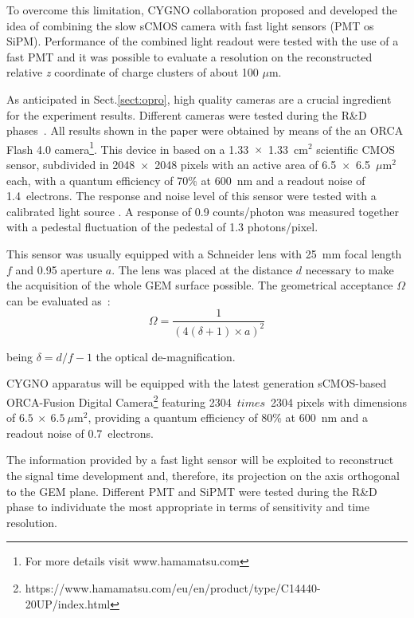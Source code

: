 \documentclass[physics,article,submit,moreauthors,pdftex]{Definitions/mdpi}
\begin{document}
To overcome this limitation, CYGNO collaboration proposed and developed the idea of combining the slow sCMOS camera with fast light sensors (PMT os SiPM).
Performance of the combined light readout were tested with the use of a fast PMT \cite{bib:combined} and it was possible to evaluate a resolution on the reconstructed relative {\it z} coordinate of charge clusters of about 100 $\mu$m.


As anticipated in Sect.\ref{sect:opro}, high quality cameras are a crucial ingredient for the experiment results. Different cameras were tested during the R\&D phases~\cite{bib:cameras}. All results shown in the paper were obtained by means of the 
 an ORCA Flash 4.0 camera\footnote{For more details visit www.hamamatsu.com}. This device in based on a 1.33~$\times$~1.33~cm$^2$ scientific CMOS sensor, subdivided in 2048~$\times$~2048 pixels with an active area of 6.5~$\times$~6.5~$\mu$m$^2$ each, with
 a quantum efficiency of 70\% at 600~nm and a readout noise of 1.4~electrons.
 The response and noise level of this sensor were tested with a calibrated light source \cite{bib:jinst_orange1}. A response of 0.9 counts/photon was measured together with a pedestal fluctuation of the pedestal of 1.3 photons/pixel. 
 
 This sensor was usually equipped with a Schneider lens with 25~mm focal length $f$ and 0.95 aperture $a$. The lens was placed at the distance $d$ necessary to make the acquisition of the whole GEM surface possible. 
 The geometrical acceptance $\Omega$ can be evaluated as~\cite{bib:ieee_orange}:
$$
 \Omega = \frac{1}{\left(4(\delta+1)\times a \right)^2}
$$

being $\delta = d/f - 1$ the optical de-magnification.

CYGNO apparatus will be equipped with the latest generation sCMOS-based ORCA-Fusion Digital Camera\footnote{https://www.hamamatsu.com/eu/en/product/type/C14440-20UP/index.html} featuring 2304~$times$~2304 pixels with dimensions of $6.5~\times~6.5~\mu$m$^2$, providing a quantum efficiency of 80\% at 600~nm and a readout noise of 0.7~electrons.


The information provided by a fast light sensor will be exploited to reconstruct the signal time development and, therefore, its projection on the axis orthogonal to the GEM plane. Different PMT and SiPMT were tested during the R&D phase to individuate the most appropriate in terms of sensitivity and time resolution.
\end{document}
